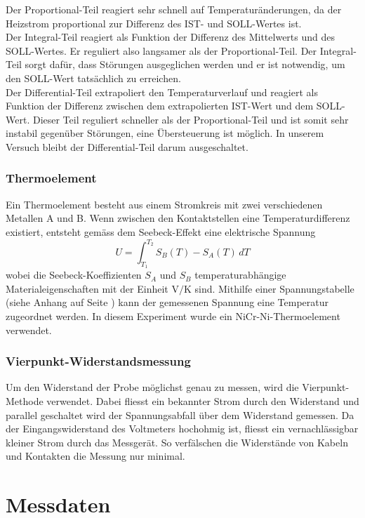 \documentclass[a4paper,parskip,11pt, DIV12]{scrreprt}
\begin{document}
Der Proportional-Teil reagiert sehr schnell auf Temperaturänderungen, da der Heizstrom proportional zur Differenz des IST- und SOLL-Wertes ist.\\
Der Integral-Teil reagiert als Funktion der Differenz des Mittelwerts und des SOLL-Wertes. Er reguliert also langsamer als der Proportional-Teil. Der Integral-Teil sorgt dafür, dass Störungen ausgeglichen werden und er ist notwendig, um den SOLL-Wert tatsächlich zu erreichen.\\
Der Differential-Teil extrapoliert den Temperaturverlauf und reagiert als Funktion der Differenz zwischen dem extrapolierten IST-Wert und dem SOLL-Wert. Dieser Teil reguliert schneller als der Proportional-Teil und ist somit sehr instabil gegenüber Störungen, eine Übersteuerung ist möglich. In unserem Versuch bleibt der Differential-Teil darum ausgeschaltet. 


\subsection{Thermoelement}
Ein Thermoelement besteht aus einem Stromkreis mit zwei verschiedenen Metallen A und B. Wenn zwischen den Kontaktstellen eine Temperaturdifferenz existiert, entsteht gemäss dem Seebeck-Effekt eine elektrische Spannung 
%
\begin{equation}
U = \int_{T_{1}}^{T_{2}} S_{B}(T) - S_{A}(T) \, dT
\end{equation}
%
wobei die Seebeck-Koeffizienten $S_{A}$ und $S_{B}$ temperaturabhängige Materialeigenschaften mit der Einheit V$/$K sind. Mithilfe einer Spannungstabelle (siehe Anhang auf Seite \pageref{Kacktabelle}) kann der gemessenen Spannung eine Temperatur zugeordnet werden. In diesem Experiment wurde ein NiCr-Ni-Thermoelement verwendet.

\subsection{Vierpunkt-Widerstandsmessung}
Um den Widerstand der Probe möglichst genau zu messen, wird die Vierpunkt-Methode verwendet. Dabei fliesst ein bekannter Strom durch den Widerstand und parallel geschaltet wird der Spannungsabfall über dem Widerstand gemessen. Da der Eingangswiderstand des Voltmeters hochohmig ist, fliesst ein vernachlässigbar kleiner Strom durch das Messgerät. So verfälschen die Widerstände von Kabeln und Kontakten die Messung nur minimal.

\newpage

\chapter{Messdaten}
\end{document}

